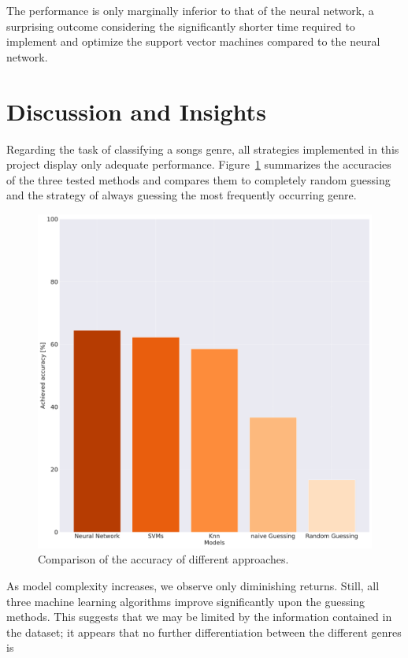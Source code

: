\documentclass[
  12pt,
  bibliography=totoc,     %
  captions=tableheading,  %
  titlepage=firstiscover, %
]{scrartcl}
\begin{document}
\noindent
The performance is only marginally inferior to that of the neural network, a surprising outcome considering the significantly shorter time required to implement and optimize
the support vector machines compared to the neural network.

\section{Discussion and Insights}
Regarding the task of classifying a songs genre, all strategies implemented in this project display only adequate performance. Figure~\ref{fig:performance_comp}
summarizes the accuracies of the three tested methods and compares them to completely random guessing and the strategy of always guessing the most frequently occurring
genre.
\begin{figure}[H]
  \centering
  \includegraphics[scale=0.25]{figures/performance-comparison.pdf}
  \caption{Comparison of the accuracy of different approaches.}
  \label{fig:performance_comp}
\end{figure}
\noindent
As model complexity increases, we observe only diminishing returns. Still, all three machine learning algorithms improve significantly upon the guessing
methods. This suggests that we may be  limited by the information contained in the dataset; it appears that no further differentiation between the different genres is
\end{document}

